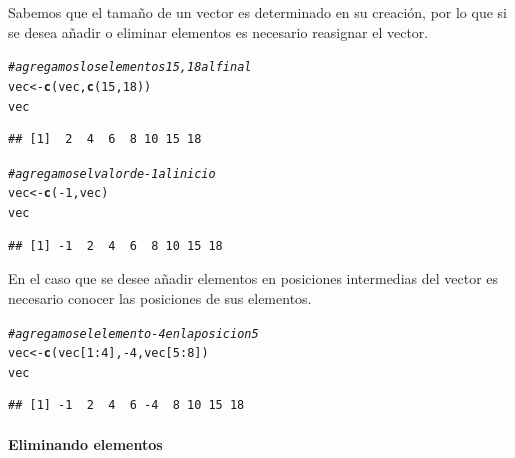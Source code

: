 \documentclass[11pt,a4paper,oneside]{book}\usepackage[]{graphicx}\usepackage[]{color}
\makeatletter
\newcommand{\hlnum}[1]{\textcolor[rgb]{0.686,0.059,0.569}{#1}}%
\newcommand{\hlcom}[1]{\textcolor[rgb]{0.678,0.584,0.686}{\textit{#1}}}%
\newcommand{\hlopt}[1]{\textcolor[rgb]{0,0,0}{#1}}%
\newcommand{\hlstd}[1]{\textcolor[rgb]{0.345,0.345,0.345}{#1}}%
\newcommand{\hlkwb}[1]{\textcolor[rgb]{0.69,0.353,0.396}{#1}}%
\newcommand{\hlkwd}[1]{\textcolor[rgb]{0.737,0.353,0.396}{\textbf{#1}}}%
\newenvironment{kframe}{%
 \def\at@end@of@kframe{}%
 \ifinner\ifhmode%
  \def\at@end@of@kframe{\end{minipage}}%
  \begin{minipage}{\columnwidth}%
 \fi\fi%
 \def\FrameCommand##1{\hskip\@totalleftmargin \hskip-\fboxsep
 \colorbox{shadecolor}{##1}\hskip-\fboxsep
     \hskip-\linewidth \hskip-\@totalleftmargin \hskip\columnwidth}%
 \MakeFramed {\advance\hsize-\width
   \@totalleftmargin\z@ \linewidth\hsize
   \@setminipage}}%
 {\par\unskip\endMakeFramed%
 \at@end@of@kframe}
\newenvironment{knitrout}{}{} %
\makeatother
\begin{document}
\begin{itemize}
Sabemos que el tamaño de un vector es determinado en su creación, por lo que si se desea añadir o eliminar elementos es necesario reasignar el vector.
\begin{knitrout}
\color{fgcolor}\begin{kframe}
\begin{alltt}
\hlcom{# agregamos los elementos 15, 18 al final}
\hlstd{vec} \hlkwb{<-} \hlkwd{c}\hlstd{(vec,} \hlkwd{c}\hlstd{(}\hlnum{15}\hlstd{,} \hlnum{18}\hlstd{))}
\hlstd{vec}
\end{alltt}
\begin{verbatim}
## [1]  2  4  6  8 10 15 18
\end{verbatim}
\begin{alltt}
\hlcom{# agregamos el valor de -1 al inicio}
\hlstd{vec} \hlkwb{<-} \hlkwd{c}\hlstd{(}\hlopt{-}\hlnum{1}\hlstd{, vec)}
\hlstd{vec}
\end{alltt}
\begin{verbatim}
## [1] -1  2  4  6  8 10 15 18
\end{verbatim}
\end{kframe}
\end{knitrout}

En el caso que se desee añadir elementos en posiciones intermedias del vector es necesario conocer las posiciones de sus elementos.
\begin{knitrout}
\color{fgcolor}\begin{kframe}
\begin{alltt}
\hlcom{# agregamos el elemento -4 en la posicion 5}
\hlstd{vec} \hlkwb{<-} \hlkwd{c}\hlstd{(vec[}\hlnum{1}\hlopt{:}\hlnum{4}\hlstd{],} \hlopt{-}\hlnum{4}\hlstd{, vec[}\hlnum{5}\hlopt{:}\hlnum{8}\hlstd{])}
\hlstd{vec}
\end{alltt}
\begin{verbatim}
## [1] -1  2  4  6 -4  8 10 15 18
\end{verbatim}
\end{kframe}
\end{knitrout}

\paragraph{Eliminando elementos}
~\\


\end{itemize}
\end{document}
